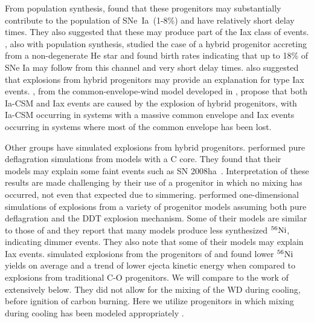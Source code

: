 \documentclass[preprint2]{aastex63}
\newcommand{\SNeIa}{SNe~Ia}
\newcommand{\Ni}[1]{\ensuremath{{}^{#1}{\rm Ni}}}
\begin{document}
From population synthesis, \citet{mengpods2014} found that these
progenitors may substantially contribute to the population of \SNeIa\ (1-8\%) and have
relatively short delay times. They also suggested that these
may produce part of the Iax class of events. \citet{Wangetal2014}, also with population
synthesis, studied the case
of a hybrid progenitor accreting from a non-degenerate He star and found
birth rates indicating that up to 18\% of SNe Ia may follow from this channel
and very short delay times. \citet{Wangetal2014} also suggested that explosions
from hybrid progenitors may provide an explanation for type Iax events.
\citet{mengpods2018}, from the common-envelope-wind model developed in
\citet{mengpods2014}, propose that both Ia-CSM and Iax events
are caused by the explosion of hybrid progenitors, with Ia-CSM occurring in systems with
a massive common envelope and Iax events occurring in systems where most of the common envelope
has been lost.

Other groups have simulated explosions from hybrid progenitors.
\citet{kromeretal2015} performed pure deflagration simulations from models
with a C core. They found that their models may explain some faint events
such as SN 2008ha~\citep{foleyetal2009}.
Interpretation of these results are made challenging by their use of a progenitor in which no mixing has occurred, not even that expected due to simmering.
\citet{bravoetal2016} performed one-dimensional simulations of explosions from
a variety of progenitor models assuming both pure deflagration and the DDT
explosion mechanism.
Some of their models are similar to those of \citep{denissenkovetal2015} and
they report that many models produce less synthesized
\Ni{56}, indicating dimmer events. They also note that some of their
models may explain Iax events.
\citet{willcoxetal2016} simulated explosions from the progenitors of
\citet{denissenkovetal2015} and found lower
\Ni{56} yields on average and a trend of lower ejecta kinetic energy
when compared to explosions from traditional C-O progenitors.
We will compare to the work of \citet{willcoxetal2016} extensively below.
They did not allow for the mixing of the WD during cooling, before ignition of carbon burning.
Here we utilize progenitors in which mixing during cooling has been modeled appropriately \citep{brooksetal2017}.
\end{document}
